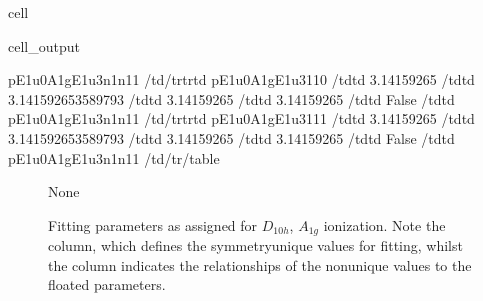 \documentclass[letterpaper,table,10pt,english]{jupyterBook}
\begin{document}
\begin{sphinxuseclass}{cell}
\begin{sphinxVerbatimOutput}
\begin{sphinxuseclass}{cell_output}
\begin{sphinxVerbatim}[commandchars=\\\{\}]
p\PYGZus{}E1u\PYGZus{}0\PYGZus{}A1g\PYGZus{}E1u\PYGZus{}3\PYGZus{}n1\PYGZus{}n1\PYGZus{}1 \PYGZlt{}/td\PYGZgt{}\PYGZlt{}/tr\PYGZgt{}\PYGZlt{}tr\PYGZgt{}\PYGZlt{}td\PYGZgt{} p\PYGZus{}E1u\PYGZus{}0\PYGZus{}A1g\PYGZus{}E1u\PYGZus{}3\PYGZus{}1\PYGZus{}1\PYGZus{}0 \PYGZlt{}/td\PYGZgt{}\PYGZlt{}td\PYGZgt{}  3.14159265 \PYGZlt{}/td\PYGZgt{}\PYGZlt{}td\PYGZgt{} 3.141592653589793 \PYGZlt{}/td\PYGZgt{}\PYGZlt{}td\PYGZgt{} \PYGZhy{}3.14159265 \PYGZlt{}/td\PYGZgt{}\PYGZlt{}td\PYGZgt{}  3.14159265 \PYGZlt{}/td\PYGZgt{}\PYGZlt{}td\PYGZgt{} False \PYGZlt{}/td\PYGZgt{}\PYGZlt{}td\PYGZgt{} p\PYGZus{}E1u\PYGZus{}0\PYGZus{}A1g\PYGZus{}E1u\PYGZus{}3\PYGZus{}n1\PYGZus{}n1\PYGZus{}1 \PYGZlt{}/td\PYGZgt{}\PYGZlt{}/tr\PYGZgt{}\PYGZlt{}tr\PYGZgt{}\PYGZlt{}td\PYGZgt{} p\PYGZus{}E1u\PYGZus{}0\PYGZus{}A1g\PYGZus{}E1u\PYGZus{}3\PYGZus{}1\PYGZus{}1\PYGZus{}1 \PYGZlt{}/td\PYGZgt{}\PYGZlt{}td\PYGZgt{}  3.14159265 \PYGZlt{}/td\PYGZgt{}\PYGZlt{}td\PYGZgt{} 3.141592653589793 \PYGZlt{}/td\PYGZgt{}\PYGZlt{}td\PYGZgt{} \PYGZhy{}3.14159265 \PYGZlt{}/td\PYGZgt{}\PYGZlt{}td\PYGZgt{}  3.14159265 \PYGZlt{}/td\PYGZgt{}\PYGZlt{}td\PYGZgt{} False \PYGZlt{}/td\PYGZgt{}\PYGZlt{}td\PYGZgt{} p\PYGZus{}E1u\PYGZus{}0\PYGZus{}A1g\PYGZus{}E1u\PYGZus{}3\PYGZus{}n1\PYGZus{}n1\PYGZus{}1 \PYGZlt{}/td\PYGZgt{}\PYGZlt{}/tr\PYGZgt{}\PYGZlt{}/table\PYGZgt{}\PYGZsq{}
\end{sphinxVerbatim}

\end{sphinxuseclass}\end{sphinxVerbatimOutput}

\end{sphinxuseclass}
\begin{figure}[htbp]
\centering
\capstart

\begin{sphinxVerbatim}[commandchars=\\\{\}]
None
\end{sphinxVerbatim}
\caption{Fitting parameters as assigned for \(D_{10h}\), \(A_{1g}\) ionization. Note the  column, which defines the symmetry\sphinxhyphen{}unique values for fitting, whilst the  column indicates the relationships of the non\sphinxhyphen{}unique values to the floated parameters.}\label{\detokenize{part2/sym-fitting-intro_220423:fig-fittingparamsd10ha1g}}\end{figure}

\sphinxAtStartPar
{}
\end{document}

